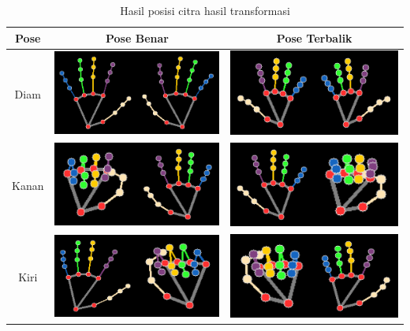 \begin{table}[H]
  \centering
  \caption{Hasil posisi citra hasil transformasi}
  \label{tab:posisigtangan}
  \begin{tabular}{|c|c|c|}
  \hline
  Pose   &Pose Benar&Pose Terbalik\\ \hline
  Diam   & \includegraphics[width=0.4\linewidth]{../Gambar/Diam (1).png} & \includegraphics[width=0.4\linewidth]{../Gambar/DiamI (1).png} \\ \hline
  Kanan  & \includegraphics[width=0.4\linewidth]{../Gambar/Kanan (1).png} & \includegraphics[width=0.4\linewidth]{../Gambar/KananI (1).png} \\ \hline
  Kiri   & \includegraphics[width=0.4\linewidth]{../Gambar/Kiri (1).png} & \includegraphics[width=0.4\linewidth]{../Gambar/KiriI (1).png} \\ \hline
  \end{tabular}
\end{table}

